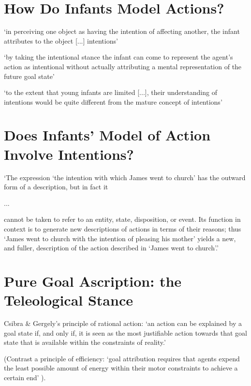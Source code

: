 \documentclass[12pt]{extarticle}
\begin{document}
\begin{multicols}{3}
 
 
\section{How Do Infants Model Actions?}
 
‘in perceiving one object as having the intention of affecting another, the infant attributes to the object [...] intentions’
\citep[p.\ 14]{Premack:1990jl}
 
‘by taking the intentional stance the infant can come to represent the agent’s action as intentional without actually attributing a mental representation of the future goal state’
\citep[p.\ 188]{Gergely:1995sq}
 
‘to the extent that young infants are limited [...], their understanding of intentions would be quite different from the mature concept of intentions’
\citep[p.\ 168]{woodward:2001_making}
 
 
 
\section{Does Infants’ Model of Action Involve Intentions?}
 
`The expression `the intention with which James went to church' has the outward form of a description, but in fact it
 
...\ %
 
cannot be taken to refer to an entity, state, disposition, or event. Its function in context is to generate new descriptions of actions in terms of their reasons; thus `James went to church with the intention of pleasing his mother' yields a new, and fuller, description of the action described in `James went to church'.'
\citep[p.\ 690]{davidson:1963_orig}
 
 
 
\section{Pure Goal Ascription: the Teleological Stance}
 
Csibra \& Gergely's principle of rational action: `an action can be explained by a goal state if, and only if, it is seen as the most justifiable action towards that goal state that is available within the constraints of reality.'\citep{Csibra:1998cx,Csibra:2003jv}
 
(Contrast a principle of efficiency: `goal attribution requires that agents expend the least possible amount of energy within their motor constraints to achieve a certain end' \citep[p.\ 1061] {Southgate:2008el}).
 

\end{multicols}
\end{document}
